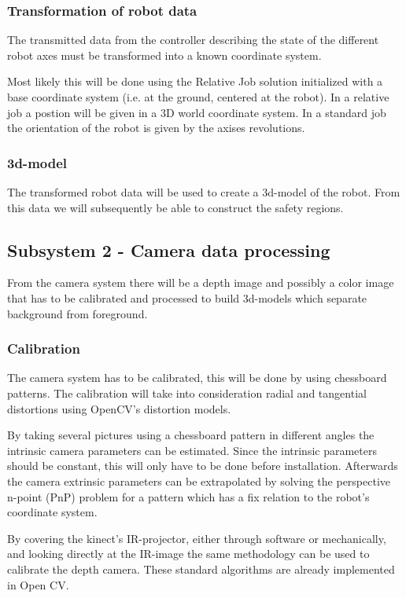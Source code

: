 \documentclass[10pt,a4paper,twocolumn,english]{article}
\begin{document}
\subsubsection{Transformation of robot data}

The transmitted data from the controller describing the state of the different robot axes must be transformed into a known coordinate system.

Most likely this will be done using the Relative Job solution initialized with a base coordinate system (i.e. at the ground, centered at the robot). In a relative job a postion will be given in a 3D world coordinate system. In a standard job the orientation of the robot is given by the axises revolutions.  

\subsubsection{3d-model}

The transformed robot data will be used to create a 3d-model of the robot. From this data we will subsequently be able to construct the safety regions.

\subsection{Subsystem 2 - Camera data processing}

From the camera system there will be a depth image and possibly a color image that has to be calibrated and processed to build 3d-models which separate background from foreground.

\subsubsection{Calibration}

The camera system has to be calibrated, this will be done by using chessboard patterns. The calibration will take into consideration radial and tangential distortions using OpenCV's distortion models.

By taking several pictures using a chessboard pattern in different angles the intrinsic camera parameters can be estimated. Since the intrinsic parameters should be constant, this will only have to be done before installation. Afterwards the camera extrinsic parameters can be extrapolated by solving the perspective n-point (PnP) problem for a pattern which has a fix relation to the robot's coordinate system.

By covering the kinect's IR-projector, either through software or mechanically, and looking directly at the IR-image the same methodology can be used to calibrate the depth camera.
These standard algorithms are already implemented in Open CV.\cite{opencv-calibration}
\end{document}
